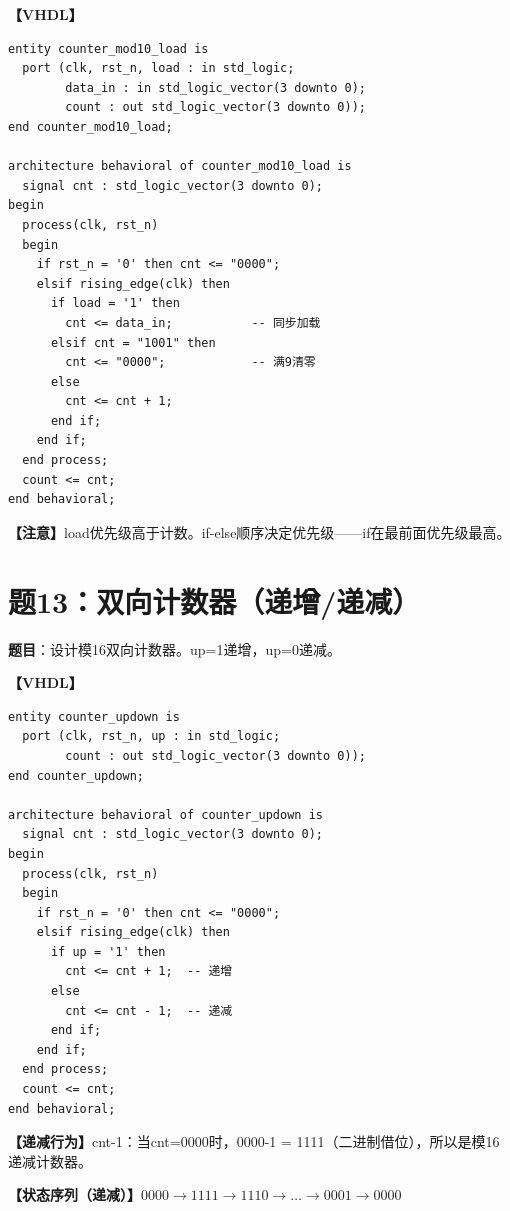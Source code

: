 \begin{solution}[完整解答]

\textbf{【VHDL】}
\begin{lstlisting}
entity counter_mod10_load is
  port (clk, rst_n, load : in std_logic;
        data_in : in std_logic_vector(3 downto 0);
        count : out std_logic_vector(3 downto 0));
end counter_mod10_load;

architecture behavioral of counter_mod10_load is
  signal cnt : std_logic_vector(3 downto 0);
begin
  process(clk, rst_n)
  begin
    if rst_n = '0' then cnt <= "0000";
    elsif rising_edge(clk) then
      if load = '1' then
        cnt <= data_in;           -- 同步加载
      elsif cnt = "1001" then
        cnt <= "0000";            -- 满9清零
      else
        cnt <= cnt + 1;
      end if;
    end if;
  end process;
  count <= cnt;
end behavioral;
\end{lstlisting}

\textbf{【注意】}load优先级高于计数。if-else顺序决定优先级——if在最前面优先级最高。

\end{solution}


\section{题13：双向计数器（递增/递减）}

\textbf{题目}：设计模16双向计数器。up=1递增，up=0递减。

\begin{solution}[完整解答]

\textbf{【VHDL】}
\begin{lstlisting}
entity counter_updown is
  port (clk, rst_n, up : in std_logic;
        count : out std_logic_vector(3 downto 0));
end counter_updown;

architecture behavioral of counter_updown is
  signal cnt : std_logic_vector(3 downto 0);
begin
  process(clk, rst_n)
  begin
    if rst_n = '0' then cnt <= "0000";
    elsif rising_edge(clk) then
      if up = '1' then
        cnt <= cnt + 1;  -- 递增
      else
        cnt <= cnt - 1;  -- 递减
      end if;
    end if;
  end process;
  count <= cnt;
end behavioral;
\end{lstlisting}

\textbf{【递减行为】}cnt-1：当cnt=0000时，0000-1 = 1111（二进制借位），所以是模16递减计数器。

\textbf{【状态序列（递减）】}$0000 \to 1111 \to 1110 \to \dots \to 0001 \to 0000$

\end{solution}


